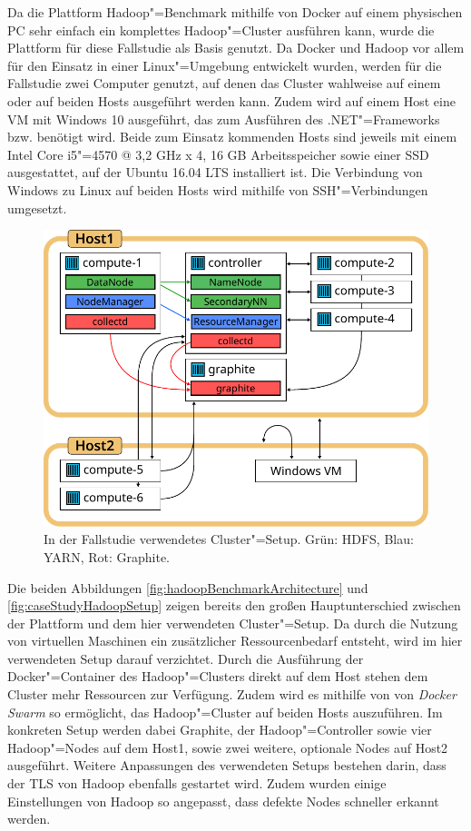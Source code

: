 Da die Plattform Hadoop"=Benchmark mithilfe von Docker auf einem physischen PC sehr einfach ein komplettes Hadoop"=Cluster ausführen kann, wurde die Plattform für diese Fallstudie als Basis genutzt.
Da Docker und Hadoop vor allem für den Einsatz in einer Linux"=Umgebung entwickelt wurden, werden für die Fallstudie zwei Computer genutzt, auf denen das Cluster wahlweise auf einem oder auf beiden Hosts ausgeführt werden kann.
Zudem wird auf einem Host eine VM mit Windows 10 ausgeführt, das zum Ausführen des .NET"=Frameworks bzw. \sS benötigt wird.
Beide zum Einsatz kommenden Hosts sind jeweils mit einem Intel Core i5"=4570 @ 3,2 GHz x 4, 16 GB Arbeitsspeicher sowie einer SSD ausgestattet, auf der Ubuntu 16.04 LTS installiert ist.
Die Verbindung von Windows zu Linux auf beiden Hosts wird mithilfe von SSH"=Verbindungen umgesetzt.

\begin{figure}
    \includegraphics{./images/caseStudyHadoopSetup.pdf}
    \caption[In der Fallstudie verwendetes Cluster"=Setup]
    {In der Fallstudie verwendetes Cluster"=Setup.
        Grün: \ac{HDFS}, Blau: YARN, Rot: Graphite.}
    \label{fig:caseStudyHadoopSetup}
\end{figure}

Die beiden Abbildungen \autoref{fig:hadoopBenchmarkArchitecture} und \autoref{fig:caseStudyHadoopSetup} zeigen bereits den großen Hauptunterschied zwischen der Plattform und dem hier verwendeten Cluster"=Setup.
Da durch die Nutzung von virtuellen Maschinen ein zusätzlicher Ressourcenbedarf entsteht, wird im hier verwendeten Setup darauf verzichtet.
Durch die Ausführung der Docker"=Container des Hadoop"=Clusters direkt auf dem Host stehen dem Cluster mehr Ressourcen zur Verfügung.
Zudem wird es mithilfe von von \emph{Docker Swarm} so ermöglicht, das Hadoop"=Cluster auf beiden Hosts auszuführen.
Im konkreten Setup werden dabei Graphite, der Hadoop"=Controller sowie vier Hadoop"=Nodes auf dem Host1, sowie zwei weitere, optionale Nodes auf Host2 ausgeführt.
Weitere Anpassungen des verwendeten Setups bestehen \uA darin, dass der \ac{TLS} von Hadoop ebenfalls gestartet wird.
Zudem wurden einige Einstellungen von Hadoop so angepasst, dass defekte Nodes schneller erkannt werden.


